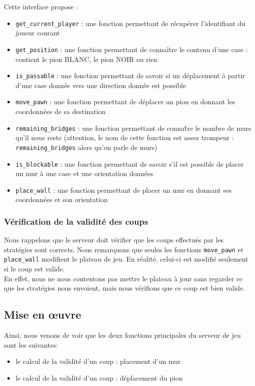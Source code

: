 \documentclass[12pt,a4paper]{article}
\begin{document}
Cette interface propose :
\begin{itemize}
\item \verb,get_current_player, : une fonction permettant de récupérer l'identifiant du joueur courant
\item \verb,get_position, :  une fonction permettant de conna\^itre le contenu d'une case : contient le
  pion BLANC, le pion NOIR ou rien
\item \verb,is_passable, : une fonction permettant de savoir si un déplacement à partir d'une case donnée vers 
  une direction donnée est possible
\item \verb,move_pawn, : une fonction permettant de déplacer un pion en donnant les coordonnées de sa destination
\item \verb,remaining_bridges, : une fonction permettant de conna\^tre le nombre de murs qu'il nous reste (attention, le nom de cette fonction est assez trompeur : \verb,remaining_bridges, alors qu'on parle de murs)
\item \verb,is_blockable, : une fonction permettant de savoir s'il est possible de placer un mur à une case et une orientation données
\item \verb,place_wall, : une fonction permettant de placer un mur en donnant ses coordonnées et son orientation
\end{itemize}

\subsubsection{Vérification de la validité des coups}

Nous rappelons que le serveur doit vérifier que les coups effectués par les stratégies 
sont corrects. Nous remarquons que seules les fonctions \verb,move_pawn, et 
\verb,place_wall, \og modifient \fg{} le plateau de jeu. En réalité, celui-ci est modifié 
seulement si le coup est valide.
\\

En effet, nous ne nous contentons pas mettre le plateau à jour sans regarder ce que les 
stratégies nous envoient, mais nous vérifions que ce coup est bien valide.

\subsection{Mise en \oe uvre}

Ainsi, nous venons de voir que les deux fonctions principales du serveur de jeu sont les 
suivantes:
\begin{itemize}
  \item le calcul de la validité d'un coup : \og placement d'un mur \fg{}
  \item le calcul de la validité d'un coup : \og déplacement du pion \fg{}
\end{itemize}
\end{document}

